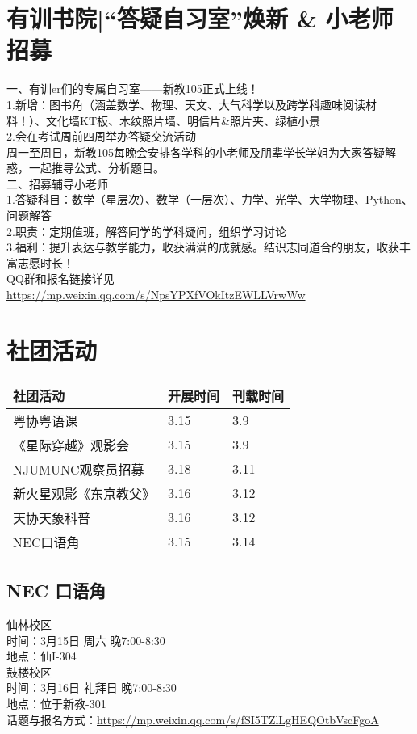 \documentclass[letterpaper, 12pt]{article}
\begin{document}
\begin{multicols}{2}
\section{有训书院|“答疑自习室”焕新 \& 小老师招募}
一、有训er们的专属自习室——新教105正式上线！\\
1.新增：图书角（涵盖数学、物理、天文、大气科学以及跨学科趣味阅读材料！）、文化墙KT板、木纹照片墙、明信片\&照片夹、绿植小景\\
2.会在考试周前四周举办答疑交流活动~\\
周一至周日，新教105每晚会安排各学科的小老师及朋辈学长学姐为大家答疑解惑，一起推导公式、分析题目。\\
二、招募辅导小老师\\
1.答疑科目：数学（星层次）、数学（一层次）、力学、光学、大学物理、Python、问题解答\\
2.职责：定期值班，解答同学的学科疑问，组织学习讨论\\
3.福利：提升表达与教学能力，收获满满的成就感。结识志同道合的朋友，收获丰富志愿时长！\\
QQ群和报名链接详见\url{https://mp.weixin.qq.com/s/NpsYPXfVOkItzEWLLVrwWw}
\section{社团活动}
\begin{tabular}{|>{\centering\arraybackslash}m{}|m{}|m{}|}
    \hline
    社团活动 & 开展时间 & 刊载时间\\
    \hline\hline
    粤协粤语课 & 3.15 & 3.9\\
    《星际穿越》观影会 & 3.15 & 3.9\\
    NJUMUNC观察员招募 & 3.18 & 3.11\\
    新火星观影《东京教父》 & 3.16 & 3.12\\
    天协天象科普 & 3.16 & 3.12\\
    NEC口语角 & 3.15 & 3.14\\
    \hline
\end{tabular}
\subsection{NEC 口语角}
仙林校区\\
时间：3月15日 周六 晚7:00-8:30\\
地点：仙I-304\\
鼓楼校区\\
时间：3月16日 礼拜日 晚7:00-8:30\\
地点：位于新教-301\\
话题与报名方式：\url{https://mp.weixin.qq.com/s/fSI5TZlLgHEQOtbVscFgoA}
\end{multicols}
\end{document}

